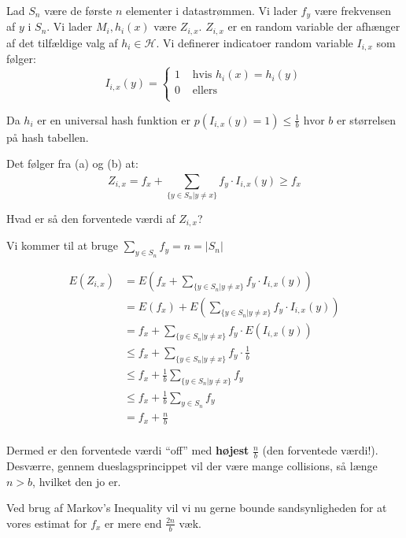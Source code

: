 \documentclass[11pt]{article}
\theoremstyle{definition}
\theoremstyle{remark}
\begin{document}
Lad $S_{n}$ være de første $n$ elementer i datastrømmen. Vi lader $f_{y}$ være frekvensen af $y$ i $S_{n}$. Vi lader $M_{i}, h_{i}(x)$ være $Z_{i,x}$. $Z_{i,x}$ er en random variable der afhænger af det tilfældige valg af $h_{i} \in \mathcal{H}$.
Vi definerer indicatoer random variable $I_{i,x}$ som følger:
\[
I_{i,x}(y) = \begin{cases}
  1 & \text{ hvis } h_{i}(x) = h_{i}(y)\\
  0 & \text{ ellers }\\
\end{cases}
\]

Da $h_{i}$ er en universal hash funktion er $p(I_{i,x}(y) = 1) \leq \frac{1}{b}$ hvor $b$ er størrelsen på hash tabellen.

Det følger fra (a) og (b) at:
\[
Z_{i,x} = f_{x} + \sum_{\{ y \in S_{n} | y \neq x \}}^{} f_{y} \cdot I_{i,x}(y) \geq f_{x}
\]

Hvad er så den forventede værdi af $Z_{i,x}$?

Vi kommer til at bruge $\sum_{y \in S_{n}}^{}f_{y}=n=|S_{n}|$

\begin{equation}
  \begin{split}
    E(Z_{i,x}) &= E(f_{x} + \sum_{\{ y \in S_{n} | y \neq x\}}^{}f_{y} \cdot I_{i,x}(y))\\
               &= E(f_{x}) + E(\sum_{\{y \in S_{n} | y \neq x\}}^{} f_{y} \cdot I_{i,x}(y))\\
               &= f_{x} + \sum_{\{ y \in S_{n} | y \neq x \}}^{} f_{y} \cdot E(I_{i,x}(y)) \\
               &\leq f_{x} + \sum_{\{y \in S_{n} | y \neq x\}}^{} f_{y} \cdot \frac{1}{b}\\
               &\leq f_{x} + \frac{1}{b} \sum_{\{y \in S_{n} | y \neq x\}}^{} f_{y}\\
               &\leq f_{x} + \frac{1}{b} \sum_{y \in S_{n}}^{} f_{y}\\
               &= f_{x} + \frac{n}{b}\\
  \end{split}
\end{equation}

Dermed er den forventede værdi ``off'' med \textbf{højest} $\frac{n}{b}$ (den forventede værdi!). Desværre, gennem dueslagsprincippet vil der være mange collisions, så længe $n > b$, hvilket den jo er.

Ved brug af Markov's Inequality vil vi nu gerne bounde sandsynligheden for at vores estimat for $f_{x}$ er mere end $\frac{2n}{b}$ væk.
\end{document}
